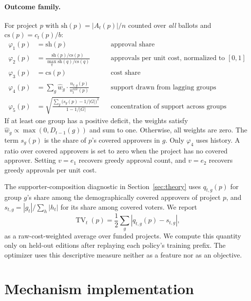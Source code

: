 \paragraph{Outcome family.}
For project $p$ with $\mathrm{sh}(p) = |A_t(p)|/n$ counted over \emph{all}
ballots and $\mathrm{cs}(p) = c_t(p)/b$:
\begin{align*}
\varphi_1(p) &= \mathrm{sh}(p) &&\text{approval share} \\
\varphi_2(p) &= \frac{\mathrm{sh}(p)/\mathrm{cs}(p)}{\max_q \mathrm{sh}(q)/\mathrm{cs}(q)}
  &&\text{approvals per unit cost, normalized to } [0,1] \\
\varphi_3(p) &= \mathrm{cs}(p) &&\text{cost share} \\
\varphi_4(p) &= \sum_{g} \hat{w}_g \cdot
  \frac{n_{t,g}(p)}{n_t^{\mathrm{cov}}(p)}
  &&\text{support drawn from lagging groups} \\
\varphi_5(p) &= \sqrt{\frac{\sum_g \big(s_g(p) - 1/|G|\big)^2}{1 - 1/|G|}}
  &&\text{concentration of support across groups}
\end{align*}
If at least one group has a positive deficit, the weights satisfy
$\hat{w}_g \propto \max(0, D_{t-1}(g))$ and sum to one. Otherwise, all weights
are zero. The term $s_g(p)$ is the
share of $p$'s covered approvers in $g$. Only $\varphi_4$ uses history. A ratio
over covered approvers is set to zero when the project has no covered approver.
Setting $v=e_1$ recovers greedy approval count, and $v=e_2$ recovers greedy
approvals per unit cost.

The supporter-composition diagnostic in Section~\ref{sec:theory} uses
$q_{t,g}(p)$ for group $g$'s share among the demographically covered approvers
of project $p$, and $s_{t,g}=|g_t|/\sum_h |h_t|$ for its share among covered
voters. We report
\[
\operatorname{TV}_t(p)=\frac{1}{2}\sum_g
  \left|q_{t,g}(p)-s_{t,g}\right|,
\]
as a raw-cost-weighted average over funded projects. We compute this quantity
only on held-out editions after replaying each policy's training prefix.
The optimizer uses this descriptive measure neither as a feature nor as an
objective.

\section{Mechanism implementation}
\label{app:mechanism}

